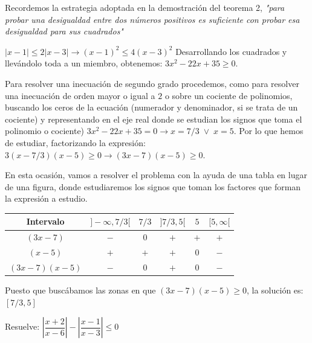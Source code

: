 		\begin{proofw}\renewcommand{\qedsymbol}{$\diamond$}
		
			Recordemos la estrategia adoptada en la demostración del teorema 2, \emph{"para probar una desigualdad entre dos números positivos es suficiente con probar esa desigualdad para sus cuadrados"}
			
			$|x-1|\le 2|x-3| \to (x-1)^2 \le 4(x-3)^2$ Desarrollando los cuadrados y llevándolo toda a un miembro, obtenemos: $3x^2-22x+35\ge 0$.
			
			Para resolver una inecuación de segundo grado procedemos, como para resolver una inecuación de orden mayor o igual a $2$ o sobre un cociente de polinomios, buscando los ceros de la ecuación (numerador y denominador, si se trata de un cociente) y representando en el eje real donde se estudian los signos que toma el polinomio o cociente)
			$3x^2-22x+35=0 \to x=7/3 \; \vee \; x=5$. Por lo que hemos de estudiar, factorizando la expresión: $3(x-7/3)(x-5)\ge 0 \to (3x-7)(x-5)\ge 0$.
			
			En esta ocasión, vamos a resolver el problema con la ayuda de una tabla en lugar de una figura, donde estudiaremos los signos que toman los factores que forman la expresión a estudio.
			
			
			
		\begin{table}[H]
		\centering
		\begin{tabular}{|c|c|c|c|c|c|}
		\hline
	 		Intervalo & $]-\infty,7/3[$ & $7/3$ & $]7/3,5[$ & $5$ & $[5,\infty[$ \\ \hline
	 		$(3x-7)$ & $-$ & $0$ & $+$ & $+$ & $+$ \\ \hline
	 		$(x-5)$ & $+$  & $+$  & $+$ & $0$ & $-$ \\ \hline
	 		$(3x-7)(x-5)$& $-$ & $0$ & $+$ & $0$ & $-$  \\ \hline
		\end{tabular}
		\end{table}
			
		Puesto que buscábamos las zonas en que $(3x-7)(x-5)\ge 0$, la solución es: $[7/3, 5]$
			
		\end{proofw}
		
		\begin{ejre}
			Resuelve:  $\left| \dfrac {x+2}{x-6} \right| - \left| \dfrac {x-1}{x-3} \right| \le 0$ 		\end{ejre}
		
